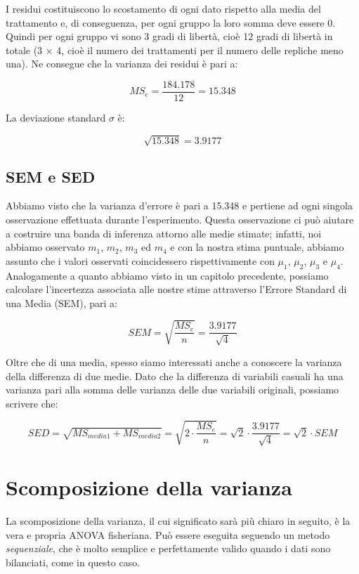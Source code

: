 \documentclass[a4paper,12pt,oneside]{book}
\begin{document}
I residui costituiscono lo scostamento di ogni dato rispetto alla media del trattamento e, di conseguenza, per ogni gruppo la loro somma deve essere 0. Quindi per ogni gruppo vi sono 3 gradi di libertà, cioè 12 gradi di libertà in totale (3 \(\times\) 4, cioè il numero dei trattamenti per il numero delle repliche meno una). Ne consegue che la varianza dei residui è pari a:

\[MS_{e}  = \frac{184.178}{12} = 15.348\]

La deviazione standard \(\sigma\) è:

\[ \sqrt{15.348} = 3.9177\]

\hypertarget{sem-e-sed}{%
\subsection{SEM e SED}\label{sem-e-sed}}

Abbiamo visto che la varianza d'errore è pari a 15.348 e pertiene ad ogni singola osservazione effettuata durante l'esperimento. Questa osservazione ci può aiutare a costruire una banda di inferenza attorno alle medie stimate; infatti, noi abbiamo osservato \(m_1\), \(m_2\), \(m_3\) ed \(m_4\) e con la nostra stima puntuale, abbiamo assunto che i valori osservati coincidessero rispettivamente con \(\mu_1\), \(\mu_2\), \(\mu_3\) e \(\mu_4\). Analogamente a quanto abbiamo visto in un capitolo precedente, possiamo calcolare l'incertezza associata alle nostre stime attraverso l'Errore Standard di una Media (SEM), pari a:

\[SEM = \sqrt{ \frac{MS_e}{n} } =  \frac{3.9177}{\sqrt{4}}\]

Oltre che di una media, spesso siamo interessati anche a conoscere la varianza della differenza di due medie. Dato che la differenza di variabili casuali ha una varianza pari alla somma delle varianza delle due variabili originali, possiamo scrivere che:

\[SED = \sqrt{ MS_{media1} + MS_{media2} } = \sqrt{ 2 \cdot \frac{MS_e}{n} } =  \sqrt{2}  \cdot \frac{3.9177}{\sqrt{4}} = \sqrt{2} \cdot SEM\]

\hypertarget{scomposizione-della-varianza}{%
\section{Scomposizione della varianza}\label{scomposizione-della-varianza}}

La scomposizione della varianza, il cui significato sarà più chiaro in seguito, è la vera e propria ANOVA fisheriana. Può essere eseguita seguendo un metodo \emph{sequenziale}, che è molto semplice e perfettamente valido quando i dati sono bilanciati, come in questo caso.
\end{document}
